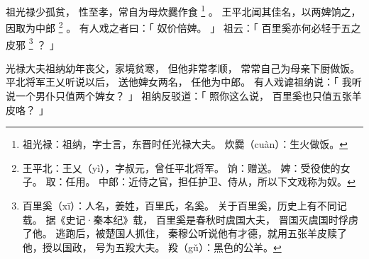
\switchcolumn*[\section{}]

祖光禄少孤贫，
性至孝，常自为母炊爨作食%
\footnote{%
    祖光禄：祖纳，字士言，东晋时任光禄大夫。
    炊爨（cuàn）：生火做饭。
}%
。
王平北闻其佳名，以两婢饷之，因取为中郎%
\footnote{%
    王平北：王乂（yì），字叔元，曾任平北将军。
    饷：赠送。
    婢：受役使的女子。
    取：任用。
    中郎：近侍之官，担任护卫、侍从，所以下文戏称为奴。
}%
。
有人戏之者曰：「
    奴价倍婢。
」
祖云：「
    百里奚亦何必轻于五之皮邪%
    \footnote{%
        百里奚（xī）：人名，姜姓，百里氏，名奚。
                      关于百里奚，历史上有不同记载。
                      据《史记·秦本纪》载，
                      百里奚是春秋时虞国大夫，
                      晋国灭虞国时俘虏了他。
                      逃跑后，被楚国人抓住，
                      秦穆公听说他有才德，就用五张羊皮赎了他，授以国政，
                      号为五羖大夫。
                      羖（gǔ）：黑色的公羊。
    }%
    ？
」

\switchcolumn

光禄大夫祖纳幼年丧父，家境贫寒，
但他非常孝顺，
常常自己为母亲下厨做饭。
平北将军王乂听说以后，
送他婢女两名，
任他为中郎。
有人戏谑祖纳说：「
    我听说一个男仆只值两个婢女？
」
祖纳反驳道：「
    照你这么说，
    百里奚也只值五张羊皮咯？
」

